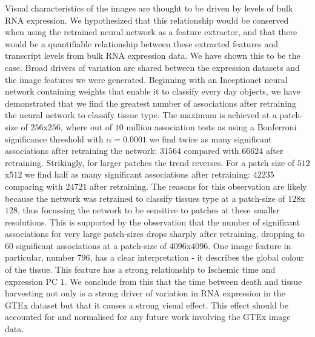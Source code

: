 \documentclass[graybox]{svmult}
\begin{document}
Visual characteristics of the images are thought to be driven by levels of bulk RNA expression. We hypothesized that this relationship would be conserved when using the retrained neural network as a feature extractor, and that there would be a quantifiable relationship between these extracted features and transcript levels from bulk RNA expression data. We have shown this to be the case. Broad drivers of variation are shared between the expression datasets and the image features we were generated. Beginning with an Inceptionet neural network containing weights that enable it to classify every day objects, we have demonstrated that we find the greatest number of associations after retraining the neural network to classify tissue type. The maximum is achieved at a patch-size of $256$x$256$, where out of $10$ million association tests as using a Bonferroni significance threshold with $\alpha = 0.0001$ we find twice as many significant associations after retraining the network: $31564$ compared with $66624$ after retraining. Strikingly, for larger patches the trend reverses. For a patch size of $512$x$512$ we find half as many significant associations after retraining: $42235$ comparing with $24721$ after retraining. The reasons for this observation are likely because the network was retrained to classify tissues type at a patch-size of $128$x$128$, thus focussing the network to be sensitive to patches at these smaller resolutions. This is supported by the observation that the number of significant associations for very large patch-sizes drops sharply after retraining, dropping to $60$ significant associations at a patch-size of $4096$x$4096$. One image feature in particular, number 796, has a clear interpretation - it describes the global colour of the tissue. This feature has a strong relationship to Ischemic time and expression PC $1$. We conclude from this that the time between death and tissue harvesting not only is a strong driver of variation in RNA expression in the GTEx dataset but that it causes a strong visual effect. This effect should be accounted for and normalised for any future work involving the GTEx image data. 
\end{document}

